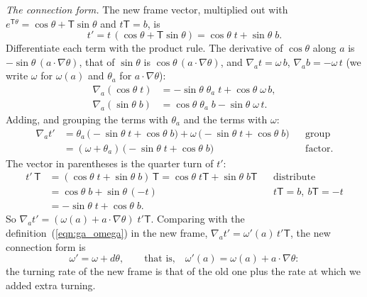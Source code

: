 \emph{The connection form.} The new frame vector, multiplied out with $e^{\mathsf T\theta} = \cos\theta + \mathsf T\sin\theta$ and $t\mathsf T = b$, is
\begin{equation*}
t' = t\,(\cos\theta + \mathsf T\sin\theta) = \cos\theta\; t + \sin\theta\; b .
\end{equation*}
Differentiate each term with the product rule. The derivative of $\cos\theta$ along $a$ is $-\sin\theta\,(a\cdot\nabla\theta)$, that of $\sin\theta$ is $\cos\theta\,(a\cdot\nabla\theta)$, and $\nabla_a t = \omega\, b$, $\nabla_a b = -\omega\, t$ (we write $\omega$ for $\omega(a)$ and $\theta_a$ for $a\cdot\nabla\theta$):
\begin{align*}
\nabla_a(\cos\theta\; t) &= -\sin\theta\;\theta_a\; t + \cos\theta\;\omega\, b , \\
\nabla_a(\sin\theta\; b) &= \cos\theta\;\theta_a\; b - \sin\theta\;\omega\, t .
\end{align*}
Adding, and grouping the terms with $\theta_a$ and the terms with $\omega$:
\begin{align*}
\nabla_a t' &= \theta_a\,\big(-\sin\theta\; t + \cos\theta\; b\big) + \omega\,\big(-\sin\theta\; t + \cos\theta\; b\big) && \text{group} \\
&= (\omega + \theta_a)\,\big(-\sin\theta\; t + \cos\theta\; b\big) && \text{factor.}
\end{align*}
The vector in parentheses is the quarter turn of $t'$:
\begin{align*}
t'\,\mathsf T &= (\cos\theta\; t + \sin\theta\; b)\,\mathsf T = \cos\theta\; t\mathsf T + \sin\theta\; b\mathsf T && \text{distribute} \\
&= \cos\theta\; b + \sin\theta\,(-t) && t\mathsf T = b,\ b\mathsf T = -t \\
&= -\sin\theta\; t + \cos\theta\; b .
\end{align*}
So $\nabla_a t' = (\omega(a) + a\cdot\nabla\theta)\; t'\mathsf T$. Comparing with the definition~(\ref{eqn:ga_omega}) in the new frame, $\nabla_a t' = \omega'(a)\, t'\mathsf T$, the new connection form is
\begin{equation*}
\omega' = \omega + d\theta, \qquad \text{that is,}\quad \omega'(a) = \omega(a) + a\cdot\nabla\theta :
\end{equation*}
the turning rate of the new frame is that of the old one plus the rate at which we added extra turning.

